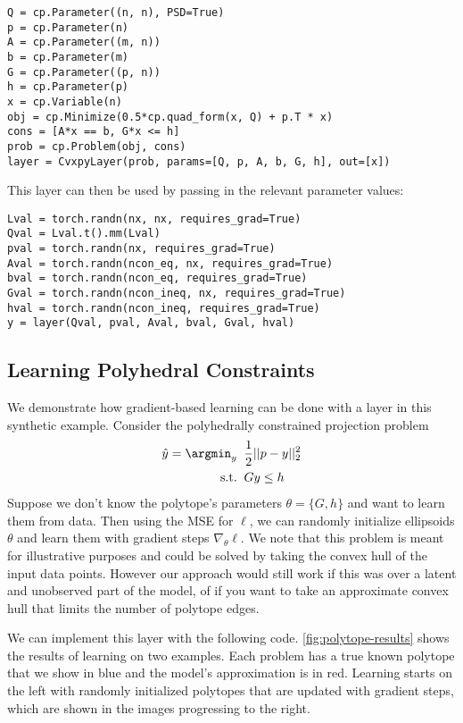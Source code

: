 \begin{lstlisting}
Q = cp.Parameter((n, n), PSD=True)
p = cp.Parameter(n)
A = cp.Parameter((m, n))
b = cp.Parameter(m)
G = cp.Parameter((p, n))
h = cp.Parameter(p)
x = cp.Variable(n)
obj = cp.Minimize(0.5*cp.quad_form(x, Q) + p.T * x)
cons = [A*x == b, G*x <= h]
prob = cp.Problem(obj, cons)
layer = CvxpyLayer(prob, params=[Q, p, A, b, G, h], out=[x])
\end{lstlisting}

This layer can then be used by passing in the
relevant parameter values:
\begin{lstlisting}
Lval = torch.randn(nx, nx, requires_grad=True)
Qval = Lval.t().mm(Lval)
pval = torch.randn(nx, requires_grad=True)
Aval = torch.randn(ncon_eq, nx, requires_grad=True)
bval = torch.randn(ncon_eq, requires_grad=True)
Gval = torch.randn(ncon_ineq, nx, requires_grad=True)
hval = torch.randn(ncon_ineq, requires_grad=True)
y = layer(Qval, pval, Aval, bval, Gval, hval)
\end{lstlisting}

\newpage
\subsection{Learning Polyhedral Constraints}
We demonstrate how gradient-based learning can be done with
a \cvxpy layer in this synthetic example.
Consider the polyhedrally constrained
projection problem
\begin{align*}
\hat y = \argmin_y\;\; &\frac{1}{2}||p-y||_2^2  \\
 {\rm s.t.}\;\; & Gy\leq h \\
\end{align*}
Suppose we don't know the polytope's parameters $\theta=\{G, h\}$
and want to learn them from data.
Then using the MSE for $\ell$, we can randomly initialize
ellipsoids $\theta$ and learn them with gradient steps $\nabla_\theta \ell$.
We note that this problem is meant for illustrative purposes and
could be solved by taking the convex hull of the input data points.
However our approach would still work if this was over a latent
and unobserved part of the model, of if you want to take an
approximate convex hull that limits the number of polytope edges.

We can implement this layer with the following code.
\cref{fig:polytope-results} shows the results of learning
on two examples.
Each problem has a true known polytope that we show in blue
and the model's approximation is in red.
Learning starts on the left with randomly initialized
polytopes that are updated with gradient steps,
which are shown in the images progressing to the right.

